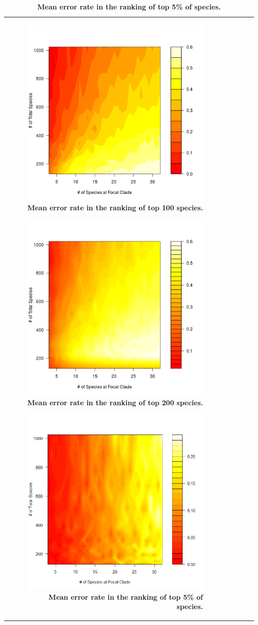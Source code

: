 \documentclass[12pt,english]{article}
\begin{document}
\begin{table}[ht]
\begin{tabular}{rrrrr}
\begin{figure}[!ht]
  \center
  \includegraphics[width=.5\textwidth]{errorRate100.png}
  \caption{\textbf{Mean error rate in the ranking of top 100 species.} }
\end{figure}

\begin{figure}[!ht]
  \center
  \includegraphics[width=.5\textwidth]{errorRate200.png}
  \caption{\textbf{Mean error rate in the ranking of top 200 species.} }
\end{figure}

\begin{figure}[!ht]
  \center
  \includegraphics[width=.5\textwidth]{errorRate5pct.png}
  \caption{\textbf{Mean error rate in the ranking of top 5\% of species.} }
\end{figure}


\end{tabular}
\end{table}
\end{document}
